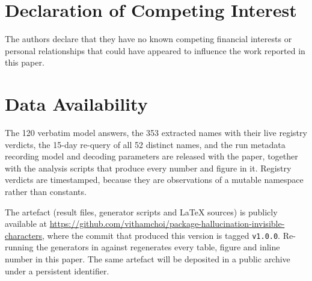 \documentclass[journal]{IEEEtran}
\theoremstyle{definition}
\newcommand{\Nprompts}{120}
\newcommand{\Npkg}{353}
\newcommand{\Recheckdays}{15}
\newcommand{\Recheckn}{52}
\begin{document}
\section*{Declaration of Competing Interest}

The authors declare that they have no known competing financial interests or
personal relationships that could have appeared to influence the work reported
in this paper.


\section*{Data Availability}

The \Nprompts{} verbatim model answers, the \Npkg{} extracted names with their
live registry verdicts, the \Recheckdays-day re-query of all \Recheckn{}
distinct names, and the run metadata recording model and decoding parameters are
released with the paper, together with the analysis scripts that produce every
number and figure in it. Registry verdicts are timestamped, because they are
observations of a mutable namespace rather than constants.

The artefact (result files, generator scripts and \LaTeX{} sources) is publicly
available at \url{https://github.com/vithamchoi/package-hallucination-invisible-characters}, where the commit that
produced this version is tagged \texttt{v1.0.0}. Re-running the generators in
 against  regenerates every table, figure and
inline number in this paper. The same artefact will be deposited in a public
archive under a persistent identifier.




\end{document}

